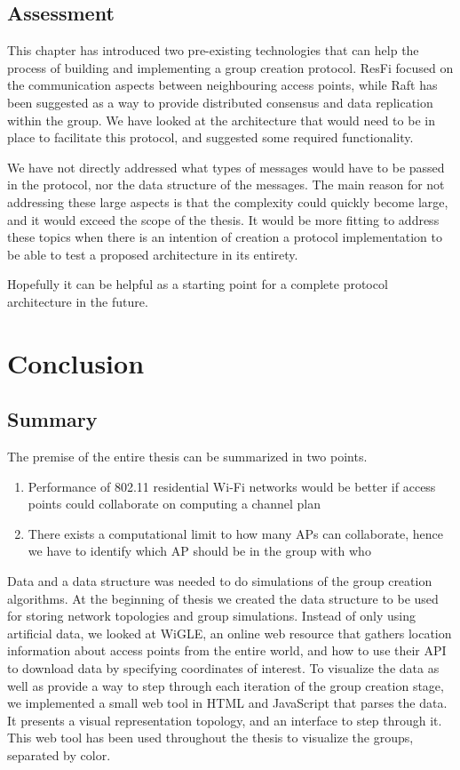 \section{Assessment}
This chapter has introduced two pre-existing technologies that can help the process of building and implementing a group creation protocol. ResFi focused on the communication aspects between
neighbouring access points, while Raft has been suggested as a way to provide distributed consensus and data replication within the group. We have looked at the architecture that
would need to be in place to facilitate this protocol, and suggested some required functionality. 

We have not directly addressed what types of messages would have to be passed in the protocol, nor the data structure of the messages. The main reason for not addressing these large aspects is 
that the complexity could quickly become large, and it would exceed the scope of the thesis. It would be more fitting to address these topics when there is an intention of creation
a protocol implementation to be able to test a proposed architecture in its entirety.  

Hopefully it can be helpful as a starting point for a complete protocol architecture in the future. 

\chapter{Conclusion}

\section{Summary}
The premise of the entire thesis can be summarized in two points. 
\begin{enumerate}
	\item Performance of 802.11 residential Wi-Fi networks would be better if access points could collaborate on computing a channel plan
	\item There exists a computational limit to how many APs can collaborate, hence we have to identify which AP should be in the group with who
\end{enumerate}

Data and a data structure was needed to do simulations of the group creation algorithms. At the beginning of thesis we created the data structure
to be used for storing network topologies and group simulations. Instead of only using artificial data, we looked at WiGLE, an online web resource that gathers location information about access points from the entire world, and how to use their API to download data by specifying coordinates of interest.
To visualize the data as well as provide a way to step through each iteration of the group creation stage, we implemented a small web tool in HTML and JavaScript that parses the data.
It presents a visual representation topology, and an interface to step through it. This web tool has been used throughout the thesis to visualize the groups, separated by color. 

